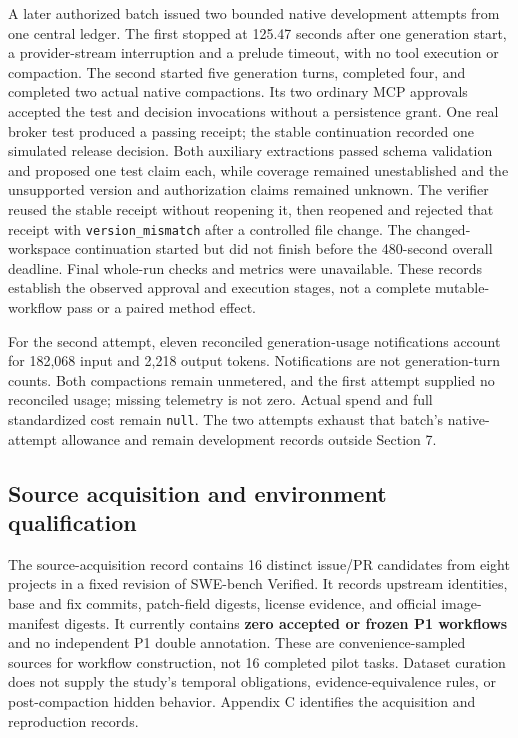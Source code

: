 A later authorized batch issued two bounded native development attempts
from one central ledger. The first stopped at 125.47 seconds after one
generation start, a provider-stream interruption and a prelude timeout,
with no tool execution or compaction. The second started five generation
turns, completed four, and completed two actual native compactions. Its
two ordinary MCP approvals accepted the test and decision invocations
without a persistence grant. One real broker test produced a passing
receipt; the stable continuation recorded one simulated release
decision. Both auxiliary extractions passed schema validation and
proposed one test claim each, while coverage remained unestablished and
the unsupported version and authorization claims remained unknown. The
verifier reused the stable receipt without reopening it, then reopened
and rejected that receipt with \texttt{version\_mismatch} after a
controlled file change. The changed-workspace continuation started but
did not finish before the 480-second overall deadline. Final whole-run
checks and metrics were unavailable. These records establish the
observed approval and execution stages, not a complete mutable-workflow
pass or a paired method effect.

For the second attempt, eleven reconciled generation-usage notifications
account for 182,068 input and 2,218 output tokens. Notifications are not
generation-turn counts. Both compactions remain unmetered, and the first
attempt supplied no reconciled usage; missing telemetry is not zero.
Actual spend and full standardized cost remain \texttt{null}. The two
attempts exhaust that batch's native-attempt allowance and remain
development records outside Section 7.

\subsection{Source acquisition and environment
qualification}\label{source-acquisition-and-environment-qualification}

The source-acquisition record contains 16 distinct issue/PR candidates
from eight projects in a fixed revision of SWE-bench Verified. It
records upstream identities, base and fix commits, patch-field digests,
license evidence, and official image-manifest digests. It currently
contains \textbf{zero accepted or frozen P1 workflows} and no
independent P1 double annotation. These are convenience-sampled sources
for workflow construction, not 16 completed pilot tasks. Dataset
curation does not supply the study's temporal obligations,
evidence-equivalence rules, or post-compaction hidden behavior. Appendix
C identifies the acquisition and reproduction records.

